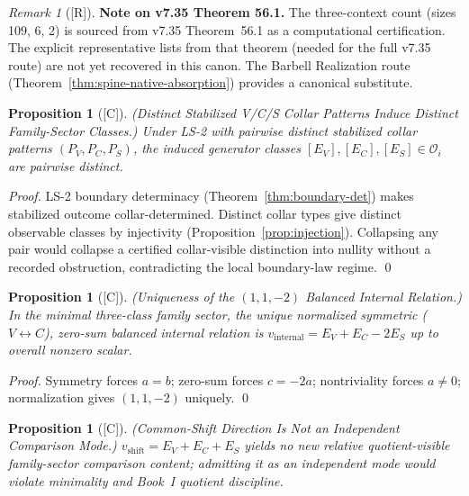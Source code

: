 \documentclass[12pt,oneside]{amsbook}
\theoremstyle{plain}
\newtheorem{proposition}[theorem]{Proposition}
\theoremstyle{definition}
\theoremstyle{remark}
\newtheorem{remark}[theorem]{Remark}
\newcommand{\status}[1]{\textup{[#1]}}
\begin{document}
\begin{remark}[\status{R}]
\textbf{Note on v7.35 Theorem 56.1.}  The three-context count (sizes
109, 6, 2) is sourced from v7.35 Theorem~56.1 as a computational
certification.  The explicit representative lists from that theorem
(needed for the full v7.35 route) are not yet recovered in this canon.
The Barbell Realization route (Theorem~\ref{thm:spine-native-absorption})
provides a canonical substitute.
\end{remark}


\begin{proposition}[\status{C}]\label{prop:distinct-collar-distinct-class}
\textup{(Distinct Stabilized V/C/S Collar Patterns Induce Distinct
Family-Sector Classes.)}
Under LS-2 with pairwise distinct stabilized collar patterns
$(P_V,P_C,P_S)$, the induced generator classes
$[E_V],[E_C],[E_S] \in \mathcal{O}_i$ are pairwise distinct.
\end{proposition}

\begin{proof}
LS-2 boundary determinacy (Theorem~\ref{thm:boundary-det})
makes stabilized outcome collar-determined.  Distinct collar types
give distinct observable classes by injectivity
(Proposition~\ref{prop:injection}).  Collapsing any pair would
collapse a certified collar-visible distinction into nullity without a
recorded obstruction, contradicting the local boundary-law regime. \qed
\end{proof}

\begin{proposition}[\status{C}]\label{prop:internal-mode-unique}
\textup{(Uniqueness of the $(1,1,-2)$ Balanced Internal Relation.)}
In the minimal three-class family sector, the unique normalized
symmetric ($V \leftrightarrow C$), zero-sum balanced internal relation is
$v_{\mathrm{internal}} = E_V + E_C - 2E_S$ up to overall nonzero scalar.
\end{proposition}

\begin{proof}
Symmetry forces $a=b$; zero-sum forces $c=-2a$; nontriviality forces
$a \neq 0$; normalization gives $(1,1,-2)$ uniquely. \qed
\end{proof}

\begin{proposition}[\status{C}]\label{prop:common-shift-nonvisible}
\textup{(Common-Shift Direction Is Not an Independent Comparison Mode.)}
$v_{\mathrm{shift}} = E_V + E_C + E_S$ yields no new relative
quotient-visible family-sector comparison content; admitting it as an
independent mode would violate minimality and Book~I quotient
discipline.
\end{proposition}
\end{document}
